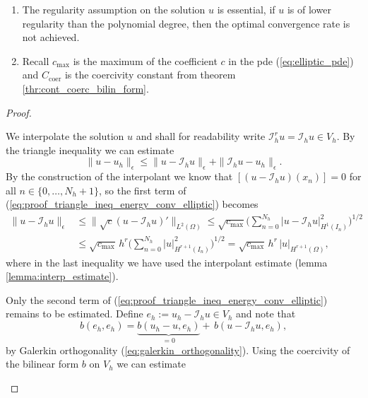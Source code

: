 \begin{remark} 
	\begin{enumerate}
		\item The regularity assumption on the solution $u$ is essential, if $u$ is of lower regularity than the polynomial degree, then the optimal convergence rate is not achieved. 
		\item Recall $c_{\max}$ is the maximum of the coefficient $c$ in the pde (\ref{eq:elliptic_pde}) and $C_{\text{coer}}$ is the coercivity constant from theorem \ref{thr:cont_coerc_bilin_form}.
	\end{enumerate}
\end{remark}
\begin{proof}
	\begin{proofstep}
		We interpolate the solution $u$ and shall for readability write $\mathcal{I}_h^r u = \mathcal{I}_h u \in V_h$. By the triangle inequality we can estimate
		\begin{equation}
			\label{eq:proof_triangle_ineq_energy_conv_elliptic}
			\| u - u_h \|_{\epsilon} \leq \|u - \mathcal{I}_h u \|_{\epsilon} + \|\mathcal{I}_h u - u_h \|_{\epsilon}.
		\end{equation}
		By the construction of the interpolant we know that $[ (u- \mathcal{I}_h u)(x_n)] = 0$ for all $n\in \{0,\ldots,N_h+1\}$, so the first term of 
		(\ref{eq:proof_triangle_ineq_energy_conv_elliptic}) becomes
		\begin{align}
			\|u - \mathcal{I}_h u \|_{\epsilon} &\leq \|\sqrt{c}(u - \mathcal{I}_h u)' \|_{L^2(\Omega)} \leq \sqrt{c_{\max}} \Big( \sum_{n=0}^{N_h} |u - \mathcal{I}_h u|_{H^1(I_n)}^2 \Big)^{1/2} \nonumber \\
			&\leq \sqrt{c_{\max}}\, h^{r} \Big( \sum_{n=0}^{N_h} |u |_{H^{r+1}(I_n)}^2 \Big)^{1/2} = \sqrt{c_{\max}}\, h^{r} \, |u |_{H^{r+1}(\Omega)}, \label{eq:proof_elliptic_energy_conv_first_term}
		\end{align}
		where in the last inequality we have used the interpolant estimate (lemma \ref{lemma:interp_estimate}).
	\end{proofstep}
	\begin{proofstep}
		Only the second term of (\ref{eq:proof_triangle_ineq_energy_conv_elliptic}) remains to be estimated. Define $e_h := u_h - \mathcal{I}_h u \in V_h$ and note that
		\begin{equation*}
			b(e_h, e_h) = \underbrace{b(u_h - u, e_h)}_{= 0} + \, b(u - \mathcal{I}_h u, e_h),
		\end{equation*}
		by Galerkin orthogonality (\ref{eq:galerkin_orthogonality}). Using the coercivity of the bilinear form $b$ on $V_h$ we can estimate 

\end{proofstep}
\end{proof}
